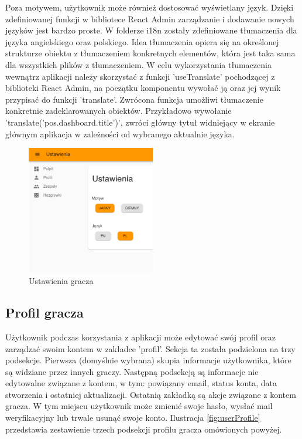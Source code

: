 Poza motywem, użytkownik może również dostosować wyświetlany język. Dzięki zdefiniowanej funkcji w bibliotece React Admin zarządzanie i dodawanie nowych języków jest bardzo proste. W folderze i18n zostały zdefiniowane tłumaczenia dla języka angielskiego oraz polskiego. Idea tłumaczenia opiera się na określonej strukturze obiektu z tłumaczeniem konkretnych elementów, która jest taka sama dla wszystkich plików z tłumaczeniem. W celu wykorzystania tłumaczenia wewnątrz aplikacji należy skorzystać z funkcji 'useTranslate' pochodzącej z biblioteki React Admin, na początku komponentu wywołać ją oraz jej wynik przypisać do funkcji 'translate'. Zwrócona funkcja umożliwi tłumaczenie konkretnie zadeklarowanych obiektów. Przykładowo wywołanie 'translate('pos.dashboard.title')', zwróci główny tytuł widniejący w ekranie głównym aplikacja w zależności od wybranego aktualnie języka.

\begin{figure}[h!]
  \centering
    \includegraphics[width=0.5\textwidth]{images/player/settings.png}
  \caption{Ustawienia gracza}
  \label{fig:settings}
\end{figure}

\subsection{Profil gracza}

Użytkownik podczas korzystania z aplikacji może edytować swój profil oraz zarządzać swoim kontem w zakładce 'profil'. Sekcja ta została podzielona na trzy podsekcje. Pierwsza (domyślnie wybrana) skupia informacje użytkownika, które są widziane przez innych graczy. Następną podsekcją są informacje nie edytowalne związane z kontem, w tym: powiązany email, status konta, data stworzenia i ostatniej aktualizacji. Ostatnią zakładką są akcje związane z kontem gracza. W tym miejscu użytkownik może zmienić swoje hasło, wysłać mail weryfikacyjny lub trwale usunąć swoje konto. Ilustracja \ref{fig:userProfile} przedstawia zestawienie trzech podsekcji profilu gracza omówionych powyżej.

